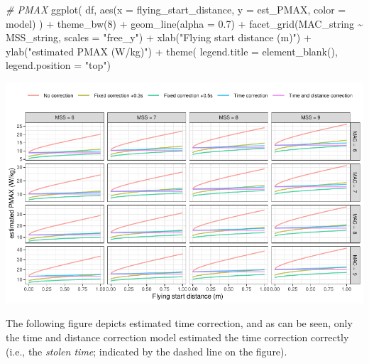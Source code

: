 \documentclass[fleqn,10pt,lineno]{wlpeerj} %
\newenvironment{Shaded}{\begin{snugshade}}{\end{snugshade}}
\newcommand{\AttributeTok}[1]{\textcolor[rgb]{0.77,0.63,0.00}{#1}}
\newcommand{\CommentTok}[1]{\textcolor[rgb]{0.56,0.35,0.01}{\textit{#1}}}
\newcommand{\DecValTok}[1]{\textcolor[rgb]{0.00,0.00,0.81}{#1}}
\newcommand{\FloatTok}[1]{\textcolor[rgb]{0.00,0.00,0.81}{#1}}
\newcommand{\FunctionTok}[1]{\textcolor[rgb]{0.00,0.00,0.00}{#1}}
\newcommand{\NormalTok}[1]{#1}
\newcommand{\SpecialCharTok}[1]{\textcolor[rgb]{0.00,0.00,0.00}{#1}}
\newcommand{\StringTok}[1]{\textcolor[rgb]{0.31,0.60,0.02}{#1}}
\begin{document}
\begin{Shaded}
\begin{Highlighting}[]
\CommentTok{\# PMAX}
\FunctionTok{ggplot}\NormalTok{(}
\NormalTok{  df,}
  \FunctionTok{aes}\NormalTok{(}\AttributeTok{x =}\NormalTok{ flying\_start\_distance, }\AttributeTok{y =}\NormalTok{ est\_PMAX, }\AttributeTok{color =}\NormalTok{ model)}
\NormalTok{) }\SpecialCharTok{+}
  \FunctionTok{theme\_bw}\NormalTok{(}\DecValTok{8}\NormalTok{) }\SpecialCharTok{+}
  \FunctionTok{geom\_line}\NormalTok{(}\AttributeTok{alpha =} \FloatTok{0.7}\NormalTok{) }\SpecialCharTok{+}
  \FunctionTok{facet\_grid}\NormalTok{(MAC\_string }\SpecialCharTok{\textasciitilde{}}\NormalTok{ MSS\_string, }\AttributeTok{scales =} \StringTok{"free\_y"}\NormalTok{) }\SpecialCharTok{+}
  \FunctionTok{xlab}\NormalTok{(}\StringTok{"Flying start distance (m)"}\NormalTok{) }\SpecialCharTok{+}
  \FunctionTok{ylab}\NormalTok{(}\StringTok{"estimated PMAX (W/kg)"}\NormalTok{) }\SpecialCharTok{+}
  \FunctionTok{theme}\NormalTok{(}
    \AttributeTok{legend.title =} \FunctionTok{element\_blank}\NormalTok{(),}
    \AttributeTok{legend.position =} \StringTok{"top"}\NormalTok{)}
\end{Highlighting}
\end{Shaded}

\begin{center}\includegraphics[width=1\linewidth]{paper_files/figure-latex/unnamed-chunk-44-1} \end{center}

The following figure depicts estimated time correction, and as can be seen, only the time and distance correction model estimated the time correction correctly (i.e., the \emph{stolen time}; indicated by the dashed line on the figure).
\end{document}
